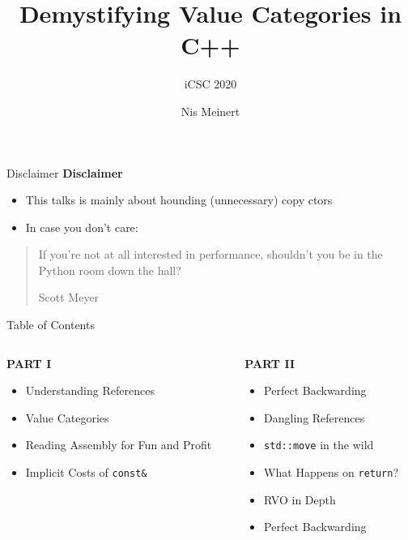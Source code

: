 \documentclass[compress,aspectratio=1610]{beamer}
\title{Demystifying Value Categories in C++}
\subtitle{iCSC 2020}
\institute{Rostock University}
\author{Nis Meinert}
\date{}
\begin{document}
\maketitle

\begin{frame}{Disclaimer}
    \textbf{Disclaimer} 
    \begin{itemize}
        \item This talks is mainly about hounding (unnecessary) copy ctors
        \item In case you don't care:
    \end{itemize}

    \blockquote[Scott Meyer]{If you’re not at all interested in performance, shouldn’t you be in the Python room down the hall?}
\end{frame}

\begin{frame}{Table of Contents}
    \begin{columns}[t]
        \begin{column}{.4\textwidth}
            \textbf{PART I}
            \begin{itemize}
                \item Understanding References
                \item Value Categories
                \item Reading Assembly for Fun and Profit
                \item Implicit Costs of \texttt{const\&}
            \end{itemize}
        \end{column}
        \begin{column}{.4\textwidth}
            \textbf{PART II}
            \begin{itemize}
                \item Perfect Backwarding
                \item Dangling References
                \item \texttt{std::move} in the wild
                \item What Happens on \texttt{return}?
                \item RVO in Depth
                \item Perfect Backwarding
            \end{itemize}
        \end{column}
    \end{columns}
\end{frame}

\begin{frame}
    \centering
    \scalebox{5}{PART I}
\end{frame}


\begin{frame}
    \centering
    \scalebox{5}{PART II}
\end{frame}

\end{document}
